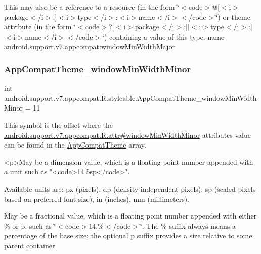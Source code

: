 This may also be a reference to a resource (in the form \char`\"{}$<$code$>$@\mbox{[}$<$i$>$package$<$/i$>$\+:\mbox{]}$<$i$>$type$<$/i$>$\+:$<$i$>$name$<$/i$>$$<$/code$>$\char`\"{}) or theme attribute (in the form \char`\"{}$<$code$>$?\mbox{[}$<$i$>$package$<$/i$>$\+:\mbox{]}\mbox{[}$<$i$>$type$<$/i$>$\+:\mbox{]}$<$i$>$name$<$/i$>$$<$/code$>$\char`\"{}) containing a value of this type.  name android.\+support.\+v7.\+appcompat\+:window\+Min\+Width\+Major \mbox{\label{classandroid_1_1support_1_1v7_1_1appcompat_1_1R_1_1styleable_a907f4aa44d62f6a4a0f50520dea3f4f1}} 
\subsubsection{\texorpdfstring{App\+Compat\+Theme\+\_\+window\+Min\+Width\+Minor}{AppCompatTheme\_windowMinWidthMinor}}
{\footnotesize\ttfamily int android.\+support.\+v7.\+appcompat.\+R.\+styleable.\+App\+Compat\+Theme\+\_\+window\+Min\+Width\+Minor = 11\hspace{0.3cm}{\ttfamily [static]}}

This symbol is the offset where the \hyperlink{classandroid_1_1support_1_1v7_1_1appcompat_1_1R_1_1attr_a44efbb3ecb10ad7ef826badb3c6342ac}{android.\+support.\+v7.\+appcompat.\+R.\+attr\#window\+Min\+Width\+Minor} attribute\textquotesingle{}s value can be found in the \hyperlink{classandroid_1_1support_1_1v7_1_1appcompat_1_1R_1_1styleable_a5c42f89e8a410c323be34208d75c430b}{App\+Compat\+Theme} array.

\begin{DoxyVerb}      <p>May be a dimension value, which is a floating point number appended with a unit such as "<code>14.5sp</code>".
\end{DoxyVerb}
 Available units are\+: px (pixels), dp (density-\/independent pixels), sp (scaled pixels based on preferred font size), in (inches), mm (millimeters). 

May be a fractional value, which is a floating point number appended with either \% or p, such as \char`\"{}$<$code$>$14.\%$<$/code$>$\char`\"{}. The \% suffix always means a percentage of the base size; the optional p suffix provides a size relative to some parent container. 

